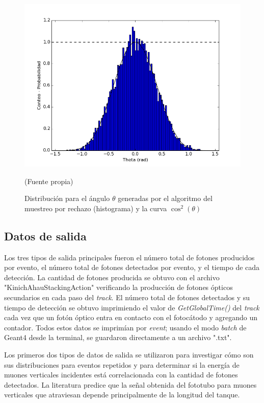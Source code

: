 \documentclass{book}
\begin{document}
\begin{figure}[h] %
\begin{center}
 \includegraphics[width=\linewidth]{ThetaDist.png}

(Fuente propia)
\caption{Distribuci\'on para el \'angulo $\theta$ generadas por el algoritmo del muestreo por rechazo (histograma) y la curva $\cos^2(\theta)$}
\end{center}
\end{figure}

\subsection{Datos de salida}

Los tres tipos de salida principales fueron el n\'umero total de fotones producidos por evento, el n\'umero total de fotones detectados por evento, y el tiempo de cada detecci\'on. La cantidad de fotones producida se obtuvo con el archivo "KinichAhauStackingAction" verificando la producci\'on de fotones \'opticos secundarios en cada paso del \textit{track}. El n\'umero total de fotones detectados y su tiempo de detecci\'on se obtuvo imprimiendo el valor de \textit{GetGlobalTime()} del \textit{track} cada vez que un fot\'on \'optico entra en contacto con el fotoc\'atodo y agregando un contador. Todos estos datos se imprim\'ian por \textit{event}; usando el modo \textit{batch} de Geant4 desde la terminal, se guardaron directamente a un archivo ".txt".

Los primeros dos tipos de datos de salida se utilizaron para investigar c\'omo son sus distribuciones para eventos repetidos y para determinar si la energ\'ia de muones verticales incidentes est\'a correlacionada con la cantidad de fotones detectados. La literatura predice que la se\~nal obtenida del fototubo para muones verticales que atraviesan depende principalmente de la longitud del tanque.
\end{document}
